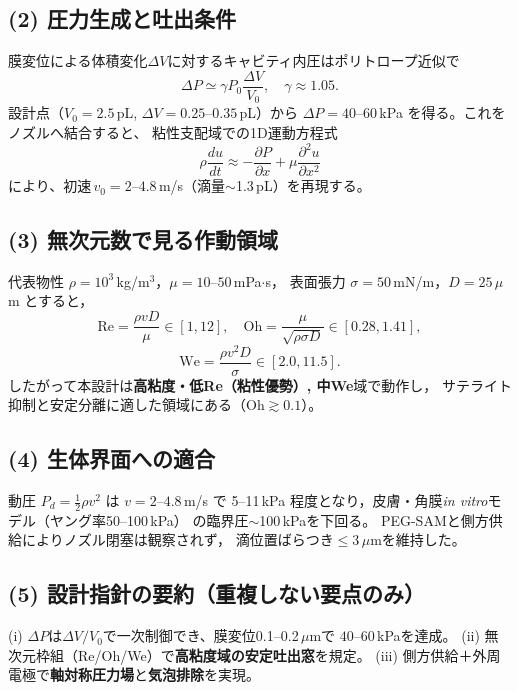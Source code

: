 \documentclass[conference]{IEEEtran}
\begin{document}
\subsection*{(2) 圧力生成と吐出条件}
膜変位による体積変化$\Delta V$に対するキャビティ内圧はポリトロープ近似で
\begin{equation}
\Delta P \simeq \gamma P_0 \frac{\Delta V}{V_0},\quad \gamma\approx 1.05.
\label{eq:pressure}
\end{equation}
設計点（$V_0=2.5$\,pL, $\Delta V=0.25$--$0.35$\,pL）から
$\Delta P=40$--$60$\,kPa を得る。これをノズルへ結合すると、
粘性支配域での1D運動方程式
\begin{equation}
\rho \frac{du}{dt} \approx -\frac{\partial P}{\partial x} + \mu \frac{\partial^2 u}{\partial x^2}
\label{eq:navier}
\end{equation}
により、初速$\,v_0=2$--$4.8$\,m/s（滴量$\sim$1.3\,pL）を再現する。

\subsection*{(3) 無次元数で見る作動領域}
代表物性 $\rho\!=\!10^3$\,kg/m$^3$，$\mu\!=\!10$--$50$\,mPa$\cdot$s，
表面張力 $\sigma\!=\!50$\,mN/m，$D\!=\!25\,\mu$m とすると，
\[
\mathrm{Re}=\frac{\rho v D}{\mu}\in[1,12],\quad
\mathrm{Oh}=\frac{\mu}{\sqrt{\rho \sigma D}}\in[0.28,1.41],
\]
\[
\mathrm{We}=\frac{\rho v^2 D}{\sigma}\in[2.0,11.5].
\]
したがって本設計は\textbf{高粘度・低Re（粘性優勢）, 中We}域で動作し，
サテライト抑制と安定分離に適した領域にある（$\mathrm{Oh}\gtrsim 0.1$）。

\subsection*{(4) 生体界面への適合}
動圧 $P_d=\tfrac{1}{2}\rho v^2$ は $v=2$--$4.8$\,m/s で
5--11\,kPa 程度となり，皮膚・角膜\emph{in vitro}モデル（ヤング率50--100\,kPa）
の臨界圧$\sim$100\,kPaを下回る。
PEG-SAMと側方供給によりノズル閉塞は観察されず，
滴位置ばらつき$\le 3\,\mu$mを維持した。

\subsection*{(5) 設計指針の要約（重複しない要点のみ）}
(i) $\Delta P$は$\Delta V/V_0$で一次制御でき、膜変位0.1--0.2\,$\mu$mで
$40$--$60$\,kPaを達成。
(ii) 無次元枠組（Re/Oh/We）で\textbf{高粘度域の安定吐出窓}を規定。
(iii) 側方供給＋外周電極で\textbf{軸対称圧力場}と\textbf{気泡排除}を実現。
\end{document}

